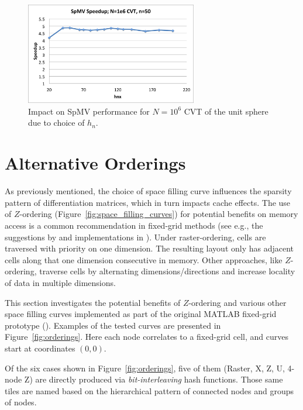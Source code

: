 \documentclass{report}
\begin{document}
\begin{figure}
\centering
\includegraphics[width=7.5cm]{../figures/stencils/cvt1m_spmv_speedup.png} 
\caption{Impact on SpMV performance for $N=10^6$ CVT of the unit sphere due to choice of $h_n$.}
\label{fig:spmv_vs_hn}
\end{figure}


\section{Alternative Orderings}

As previously mentioned, the choice of space filling curve influences the sparsity pattern of differentiation matrices, which in turn impacts cache effects. The use of $Z$-ordering (Figure~\ref{fig:space_filling_curves}) for potential benefits on memory access is a common recommendation in fixed-grid methods (see e.g., the suggestions by \cite{Johnson2011,Green2010,Krog2010} and implementations in \cite{Goswami2010, MellorCrummey2001}). Under raster-ordering, cells are traversed with priority on one dimension. The resulting layout only has adjacent cells along that one dimension consecutive in memory. Other approaches, like $Z$-ordering, traverse cells by alternating dimensions/directions and increase locality of data in multiple dimensions. 

This section investigates the potential benefits of $Z$-ordering and various other space filling curves implemented as part of the original MATLAB fixed-grid prototype (\cite{BolligRBFFixedGrid}). Examples of the tested curves are presented in Figure~\ref{fig:orderings}. Here each node correlates to a fixed-grid cell, and curves start at coordinates $(0,0)$. 

Of the six cases shown in Figure~\ref{fig:orderings}, five of them (Raster, X, Z, U, 4-node Z) are directly produced via \emph{bit-interleaving} hash functions. Those same tiles are named based on the hierarchical pattern of connected nodes and groups of nodes. 
\end{document}
